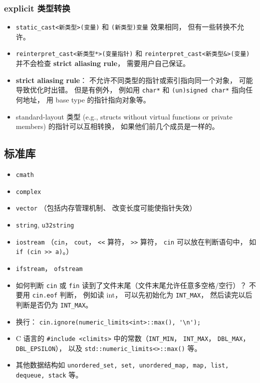 \subsubsection{explicit 类型转换}
\begin{itemize}
\item \verb`static_cast<新类型>(变量)` 和 \verb`(新类型)变量` 效果相同， 但有一些转换不允许。
\item \verb`reinterpret_cast<新类型*>(变量指针)` 和 \verb`reinterpret_cast<新类型&>(变量)` 并不会检查 \textbf{strict aliasing rule}， 需要用户自己保证。
\item \textbf{strict aliasing rule}： 不允许不同类型的指针或索引指向同一个对象， 可能导致优化时出错。 但是有例外， 例如用 \verb`char*` 和 \verb`(un)signed char*` 指向任何地址， 用 base type 的指针指向对象等。
\item standard-layout 类型 (e.g., structs without virtual functions or private members) 的指针可以互相转换， 如果他们前几个成员是一样的。
\end{itemize}

\subsection{标准库}
\begin{itemize}
\item \verb`cmath`
\item \verb`complex`
\item \verb`vector` （包括内存管理机制、 改变长度可能使指针失效）
\item \verb`string`, \verb`u32string`
\item \verb`iostream` （\verb`cin`， \verb`cout`， \verb`<<` 算符， \verb`>>` 算符， \verb`cin` 可以放在判断语句中， 如 \verb`if (cin >> a)`。）
\item \verb`ifstream`， \verb`ofstream`
\item 如何判断 \verb`cin` 或 \verb`fin` 读到了文件末尾（文件末尾允许任意多空格/空行）？ 不要用 \verb`cin.eof` 判断， 例如读 int， 可以先初始化为 \verb`INT_MAX`， 然后读完以后判断是否仍为 \verb`INT_MAX`。
\item 换行： \verb`cin.ignore(numeric_limits<int>::max(), '\n');`
\item C 语言的 \verb`#include <climits>` 中的常数（\verb`INT_MIN`， \verb`INT_MAX`， \verb`DBL_MAX`， \verb`DBL_EPSILON`）， 以及 \verb`std::numeric_limits<>::max()` 等。
\item 其他数据结构如 \verb`unordered_set, set, unordered_map, map, list, dequeue, stack` 等。
\end{itemize}


